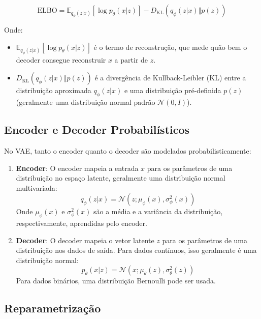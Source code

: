 \documentclass{tufte-handout}
\begin{document}
\begin{equation}
    \text{ELBO} = \mathbb{E}_{q_{\phi}(z|x)} \left[ \log p_{\theta}(x|z) \right] - D_{\text{KL}}(q_{\phi}(z|x) \Vert p(z))
\end{equation}

Onde:
\begin{itemize}
\item $\mathbb{E}_{q_{\phi}(z|x)} \left[ \log p_{\theta}(x|z) \right]$ é o termo de reconstrução, que mede quão bem o decoder consegue reconstruir $x$ a partir de $z$.
\item $D_{\text{KL}}(q_{\phi}(z|x) \Vert p(z))$ é a divergência de Kullback-Leibler (KL) entre a distribuição aproximada $q_{\phi}(z|x)$ e uma distribuição pré-definida $p(z)$ (geralmente uma distribuição normal padrão $\mathcal{N}(0, I)$).
\end{itemize}

\subsection{Encoder e Decoder Probabilísticos}

No VAE, tanto o encoder quanto o decoder são modelados probabilisticamente:
\begin{enumerate}
    \item \textbf{Encoder}: O encoder mapeia a entrada $x$ para os parâmetros de uma distribuição no espaço latente, geralmente uma distribuição normal multivariada:
   \begin{equation}
       q_{\phi}(z|x) = \mathcal{N}(z; \mu_{\phi}(x), \sigma_{\phi}^2(x))
   \end{equation}
   Onde $\mu_{\phi}(x)$ e $\sigma_{\phi}^2(x)$ são a média e a variância da distribuição, respectivamente, aprendidas pelo encoder.
   \item \textbf{Decoder}: O decoder mapeia o vetor latente $z$ para os parâmetros de uma distribuição nos dados de saída. Para dados contínuos, isso geralmente é uma distribuição normal:
   \begin{equation}
       p_{\theta}(x|z) = \mathcal{N}(x; \mu_{\theta}(z), \sigma_{\theta}^2(z))
   \end{equation}
   Para dados binários, uma distribuição Bernoulli pode ser usada.

\end{enumerate} 

\subsection{Reparametrização}
\end{document}

